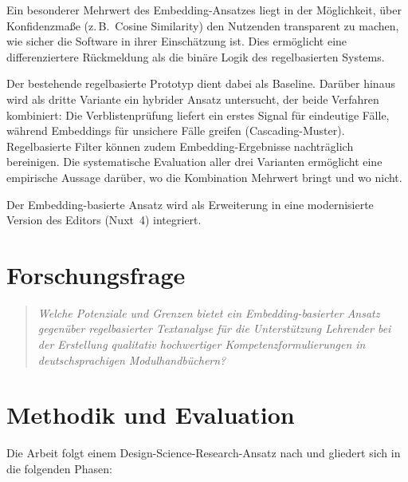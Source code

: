 \documentclass[12pt,a4paper]{article}
\begin{document}
Ein besonderer Mehrwert des Embedding-Ansatzes liegt in der M\"oglichkeit, \"uber Konfidenzma\ss e (z.\,B.\ Cosine Similarity) den Nutzenden transparent zu machen, wie sicher die Software in ihrer Einsch\"atzung ist. Dies erm\"oglicht eine differenziertere R\"uckmeldung als die bin\"are Logik des regelbasierten Systems.

Der bestehende regelbasierte Prototyp \citep{LothKonert2022} dient dabei als Baseline. Dar\"uber hinaus wird als dritte Variante ein hybrider Ansatz untersucht, der beide Verfahren kombiniert: Die Verblistenpr\"ufung liefert ein erstes Signal f\"ur eindeutige F\"alle, w\"ahrend Embeddings f\"ur unsichere F\"alle greifen (Cascading-Muster). Regelbasierte Filter k\"onnen zudem Embedding-Ergebnisse nachtr\"aglich bereinigen. Die systematische Evaluation aller drei Varianten erm\"oglicht eine empirische Aussage dar\"uber, wo die Kombination Mehrwert bringt und wo nicht.

Der Embedding-basierte Ansatz wird als Erweiterung in eine modernisierte Version des Editors (Nuxt~4) integriert.

\section{Forschungsfrage}

\begin{quote}
  \textit{\glqq Welche Potenziale und Grenzen bietet ein Embedding-basierter Ansatz gegen\"uber regelbasierter Textanalyse f\"ur die Unterst\"utzung Lehrender bei der Erstellung qualitativ hochwertiger Kompetenzformulierungen in deutschsprachigen Modulhandb\"uchern?\grqq}
\end{quote}

\section{Methodik und Evaluation}

Die Arbeit folgt einem Design-Science-Research-Ansatz nach \citet{Hevner2004} und gliedert sich in die folgenden Phasen:
\end{document}
